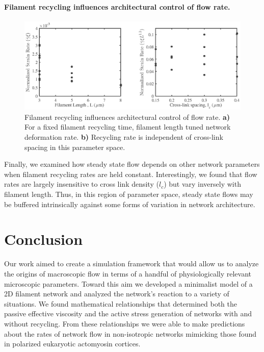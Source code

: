 \documentclass[10pt,letterpaper]{article}
\begin{document}
\paragraph{Filament recycling influences architectural control of flow rate.}

\begin{figure}[h!]
	\centering
	\includegraphics[width=\hsize]{figures/figure6b}
	\caption{\label{fig:flow_form}  Filament recycling influences architectural control of flow rate. \textbf{a)}  For a fixed filament recycling time, filament length tuned network deformation rate.  \textbf{b)} Recycling rate is independent of cross-link spacing in this parameter space.}
\end{figure}

Finally, we examined how steady state flow depends on other network parameters when filament recycling rates are held constant.   Interestingly, we found that flow rates are largely insensitive to cross link density ($l_c$) but vary inversely with filament length. Thus, in this region of parameter space, steady state flows may be buffered intrinsically against some forms of variation in network architecture.










\section*{Conclusion}
Our work aimed to create a simulation framework that would allow us to analyze the origins of macroscopic flow in terms of a handful of physiologically relevant microscopic parameters.  Toward this aim we developed a minimalist model of a 2D filament network and analyzed the network's reaction to a variety of situations.  We found mathematical relationships that determined both the passive effective viscosity and the active stress generation of networks with and without recycling.  From these relationships we were able to make predictions about the rates of network flow in non-isotropic networks mimicking those found in polarized eukaryotic actomyosin cortices.  
\end{document}
